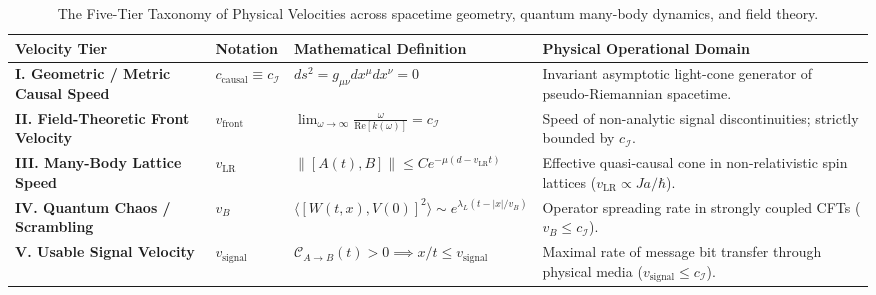\documentclass[11pt,a4paper]{article}
\begin{document}
\begin{table}[htbp]
\centering
\small
\begin{tabularx}{\linewidth}{>{\bfseries}p{2.6cm} >{\centering}p{2.2cm} >{\raggedright}p{4.2cm} X}
\toprule
Velocity Tier & Notation & Mathematical Definition & Physical Operational Domain \\
\midrule
I. Geometric / Metric Causal Speed & $c_{\text{causal}} \equiv c_{\mathcal{I}}$ & $ds^2 = g_{\mu\nu} dx^\mu dx^\nu = 0$ & Invariant asymptotic light-cone generator of pseudo-Riemannian spacetime. \\
\addlinespace
II. Field-Theoretic Front Velocity & $v_{\text{front}}$ & $\lim_{\omega \to \infty} \frac{\omega}{\text{Re}[k(\omega)]} = c_{\mathcal{I}}$ & Speed of non-analytic signal discontinuities; strictly bounded by $c_{\mathcal{I}}$. \\
\addlinespace
III. Many-Body Lattice Speed & $v_{\text{LR}}$ & $\|[A(t), B]\| \le C e^{-\mu(d - v_{\text{LR}} t)}$ & Effective quasi-causal cone in non-relativistic spin lattices ($v_{\text{LR}} \propto J a / \hbar$). \\
\addlinespace
IV. Quantum Chaos / Scrambling & $v_B$ & $\langle [W(t, x), V(0)]^2 \rangle \sim e^{\lambda_L(t - |x|/v_B)}$ & Operator spreading rate in strongly coupled CFTs ($v_B \le c_{\mathcal{I}}$). \\
\addlinespace
V. Usable Signal Velocity & $v_{\text{signal}}$ & $\mathcal{C}_{A \to B}(t) > 0 \implies x/t \le v_{\text{signal}}$ & Maximal rate of message bit transfer through physical media ($v_{\text{signal}} \le c_{\mathcal{I}}$). \\
\bottomrule
\end{tabularx}
\caption{The Five-Tier Taxonomy of Physical Velocities across spacetime geometry, quantum many-body dynamics, and field theory.}
\label{tab:velocity_taxonomy}
\end{table}
\end{document}
